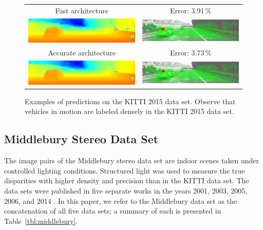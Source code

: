 \documentclass[twoside,11pt]{article}
\begin{document}
\begin{figure}[p]
\begin{center}
\begin{tabular}{cc}
Fast architecture &
Error: 3.91\,\% \\
\includegraphics[scale=0.5]{img/kitti2015_fast_195_pred_.png} &
\includegraphics[scale=0.5]{img/kitti2015_fast_195_err_.png} \\

Accurate architecture &
Error: 3.73\,\% \\
\includegraphics[scale=0.5]{img/kitti2015_slow_195_pred_.png} &
\includegraphics[scale=0.5]{img/kitti2015_slow_195_err_.png}\\
\end{tabular}

\caption{Examples of predictions on the KITTI 2015 data set. Observe that
vehicles in motion are labeled densely in the KITTI 2015 data set. }

\label{fig:kitti2015}
\end{center}
\end{figure}


\subsection{Middlebury Stereo Data Set}

The image pairs of the Middlebury stereo data set are indoor scenes taken under
controlled lighting conditions. Structured light was used to measure the true
disparities with higher density and precision than in the KITTI data set. The
data sets were published in five separate works in the years 2001, 2003, 2005,
2006, and 2014 \citep{scharstein2002taxonomy, scharstein2003high,
scharstein2007learning, hirschmuller2007evaluation, scharstein2014high}. In
this paper, we refer to the Middlebury data set as the concatenation of all five
data sets; a summary of each is presented in Table~\ref{tbl:middlebury}.
\end{document}
